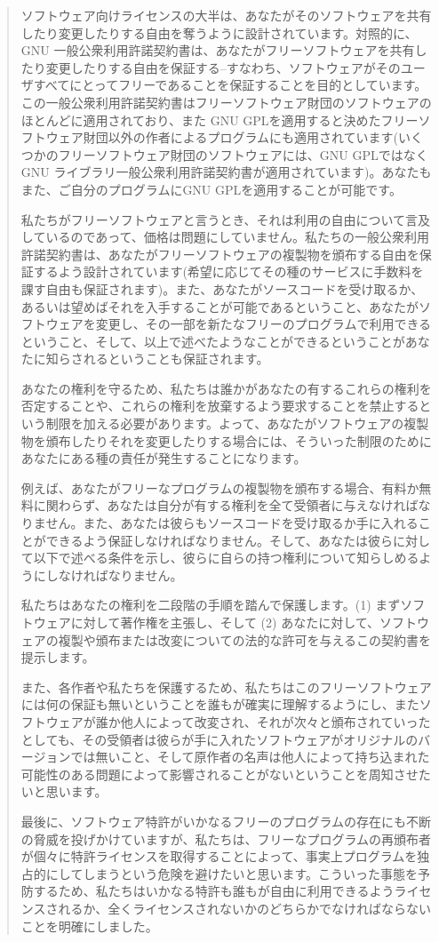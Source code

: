 \documentclass{article}
\begin{document}
\begin{quote}
ソフトウェア向けライセンスの大半は、あなたがそのソフトウェアを共有したり変更したりする自由を奪うように設計されています。対照的に、GNU 一般公衆利用許諾契約書は、あなたがフリーソフトウェアを共有したり変更したりする自由を保証する--すなわち、ソフトウェアがそのユーザすべてにとってフリーであることを保証することを目的としています。この一般公衆利用許諾契約書はフリーソフトウェア財団のソフトウェアのほとんどに適用されており、また GNU GPLを適用すると決めたフリーソフトウェア財団以外の作者によるプログラムにも適用されています(いくつかのフリーソフトウェア財団のソフトウェアには、GNU GPLではなくGNU ライブラリ一般公衆利用許諾契約書が適用されています)。あなたもまた、ご自分のプログラムにGNU GPLを適用することが可能です。


私たちがフリーソフトウェアと言うとき、それは利用の自由について言及しているのであって、価格は問題にしていません。私たちの一般公衆利用許諾契約書は、あなたがフリーソフトウェアの複製物を頒布する自由を保証するよう設計されています(希望に応じてその種のサービスに手数料を課す自由も保証されます)。また、あなたがソースコードを受け取るか、あるいは望めばそれを入手することが可能であるということ、あなたがソフトウェアを変更し、その一部を新たなフリーのプログラムで利用できるということ、そして、以上で述べたようなことができるということがあなたに知らされるということも保証されます。


あなたの権利を守るため、私たちは誰かがあなたの有するこれらの権利を否定することや、これらの権利を放棄するよう要求することを禁止するという制限を加える必要があります。よって、あなたがソフトウェアの複製物を頒布したりそれを変更したりする場合には、そういった制限のためにあなたにある種の責任が発生することになります。


例えば、あなたがフリーなプログラムの複製物を頒布する場合、有料か無料に関わらず、あなたは自分が有する権利を全て受領者に与えなければなりません。また、あなたは彼らもソースコードを受け取るか手に入れることができるよう保証しなければなりません。そして、あなたは彼らに対して以下で述べる条件を示し、彼らに自らの持つ権利について知らしめるようにしなければなりません。


私たちはあなたの権利を二段階の手順を踏んで保護します。(1) まずソフトウェアに対して著作権を主張し、そして (2) あなたに対して、ソフトウェアの複製や頒布または改変についての法的な許可を与えるこの契約書を提示します。


また、各作者や私たちを保護するため、私たちはこのフリーソフトウェアには何の保証も無いということを誰もが確実に理解するようにし、またソフトウェアが誰か他人によって改変され、それが次々と頒布されていったとしても、その受領者は彼らが手に入れたソフトウェアがオリジナルのバージョンでは無いこと、そして原作者の名声は他人によって持ち込まれた可能性のある問題によって影響されることがないということを周知させたいと思います。

最後に、ソフトウェア特許がいかなるフリーのプログラムの存在にも不断の脅威を投げかけていますが、私たちは、フリーなプログラムの再頒布者が個々に特許ライセンスを取得することによって、事実上プログラムを独占的にしてしまうという危険を避けたいと思います。こういった事態を予防するため、私たちはいかなる特許も誰もが自由に利用できるようライセンスされるか、全くライセンスされないかのどちらかでなければならないことを明確にしました。 
\end{quote}
\end{document}
